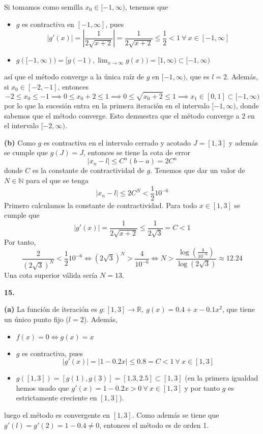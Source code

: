 \documentclass[12pt]{report}
\newcommand{\R}{\mathbb R}
\newcommand{\N}{\mathbb N}
\begin{document}
\vspace{2mm}
Si tomamos como semilla $x_0 \in [-1,\infty)$, tenemos que
\begin{itemize}
    \item $g$ es contractiva en $[-1,\infty]$, pues
    \[|g'(x)| = |\frac{1}{2\sqrt{x+2}}| = \frac{1}{2\sqrt{x+2}} \leq \frac{1}{2} < 1 \ \forall \ x \in [-1,\infty]\]
    \item $\displaystyle g([-1,\infty)) = [g(-1),\lim_{x \to \infty} g(x)) = [1,\infty) \subset [-1,\infty)$
\end{itemize}
así que el método converge a la única raíz de $g$ en $[-1,\infty)$, que es $l = 2$. Además, si $x_0 \in [-2,-1]$, entonces
\[-2 \leq x_0 \leq -1 \implies 0 \leq x_0+2 \leq 1 \implies 0 \leq \sqrt{x_0+2} \leq 1 \implies x_1 \in [0,1] \subset [-1,\infty)\]
por lo que la sucesión entra en la primera iteración en el intervalo $[-1,\infty)$, donde sabemos que el método converge. Esto demuestra que el método converge a $2$ en el intervalo $[-2,\infty)$.

\vspace{2mm}
\textbf{(b) } Como $g$ es contractiva en el intervalo cerrado y acotado $J = [1,3]$ y además se cumple que $g(J) = J$, entonces se tiene la cota de error
\[|x_n-l| \leq C^n(b-a) = 2C^n\]
donde $C$ es la constante de contractividad de $g$. Tenemos que dar un valor de $N \in \N$ para el que se tenga
\[|x_n-l| \leq 2C^N < \frac{1}{2}10^{-6}\]
Primero calculamos la constante de contractividad. Para todo $x \in [1,3]$ se cumple que
\[|g'(x)| = \frac{1}{2\sqrt{x+2}}  \leq \frac{1}{2\sqrt{3}} = C < 1\]
Por tanto,
\[\frac{2}{(2\sqrt{3})^N} < \frac{1}{2}10^{-6} \iff (2\sqrt{3})^N > \frac{4}{10^{-6}} \iff N > \frac{\log(\frac{4}{10^{-6}})}{\log(2\sqrt{3})} \approx 12.24\]
Una cota superior válida sería $N = 13$.

\vspace{6mm}
\textbf{15. }

\vspace{2mm}
\textbf{(a) } La función de iteración es $g \colon [1,3] \to \R, \ g(x) = 0.4 + x - 0.1x^2$, que tiene un único punto fijo ($l = 2$). Además,
\begin{itemize}
    \item $f(x) = 0 \iff g(x) = x$
    \item $g$ es contractiva, pues
    \[|g'(x)| = |1 -0.2x| \leq 0.8 = C < 1 \ \forall \ x \in [1,3]\]
    \item $g([1,3]) = [g(1),g(3)] = [1.3,2.5] \subset [1,3]$ (en la primera igualdad hemos usado que $g'(x) = 1-0.2x > 0 \ \forall \ x \in [1,3]$ y por tanto $g$ es estrictamente creciente en $[1,3]$).
\end{itemize}
luego el método es convergente en $[1,3]$. Como además se tiene que $g'(l) = g'(2) = 1-0.4 \neq 0$, entonces el método es de orden 1.
\end{document}
